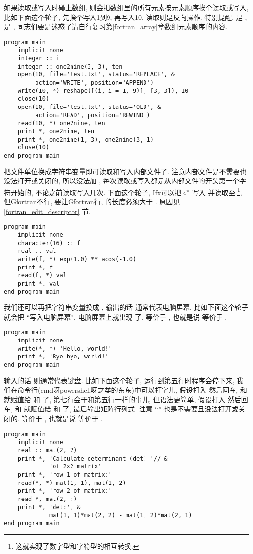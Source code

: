 如果读取或写入时碰上数组, 则会把数组里的所有元素按元素顺序挨个读取或写入, 比如下面这个轮子, 先挨个写入1到9, 再写入10, 读取则是反向操作. 特别提醒,  是 ,  是 , 同志们要是迷惑了请自行复习第\ref{fortran_array}章数组元素顺序的内容. 
\begin{lstlisting}
program main
    implicit none
    integer :: i
    integer :: one2nine(3, 3), ten
    open(10, file='test.txt', status='REPLACE', &
         action='WRITE', position='APPEND')
    write(10, *) reshape([(i, i = 1, 9)], [3, 3]), 10
    close(10)
    open(10, file='test.txt', status='OLD', &
         action='READ', position='REWIND')
    read(10, *) one2nine, ten
    print *, one2nine, ten
    print *, one2nine(1, 3), one2nine(3, 1)
    close(10)
end program main
\end{lstlisting}

把文件单位换成字符串变量即可读取和写入内部文件了. 注意内部文件是不需要也没法打开或关闭的, 所以没法加 , 每次读取或写入都是从内部文件的开头第一个字符开始的, 不论之前读取写入几次. 下面这个轮子, Ifx可以把 $ e^\pi $ 写入  并读取至 \footnote{这就实现了数字型和字符型的相互转换.}, 但Gfortran不行, 要让Gfortran行,  的长度必须大于 . 原因见 \ref{fortran_edit_descriptor} 节. \label{internal_file}
\begin{lstlisting}
program main
    implicit none
    character(16) :: f
    real :: val
    write(f, *) exp(1.0) ** acos(-1.0)
    print *, f
    read(f, *) val
    print *, val
end program main
\end{lstlisting}

我们还可以再把字符串变量换成 \ttt{*}, 输出的话 \ttt{*} 通常代表电脑屏幕. 比如下面这个轮子就会把  ``写入电脑屏幕'', 电脑屏幕上就出现  了.  等价于 , 也就是说  等价于 .
\begin{lstlisting}
program main
    implicit none
    write(*, *) 'Hello, world!'
    print *, 'Bye bye, world!'
end program main
\end{lstlisting}
输入的话 \ttt{*} 则通常代表键盘. 比如下面这个轮子, 运行到第五行时程序会停下来, 我们在命令行(cmd呀powershell呀之类的东东)中可以打字儿, 假设打入  然后回车, 和  就赋值给  和  了, 第七行会干和第五行一样的事儿, 但语法更简单, 假设打入 然后回车, 和 就赋值给  和  了, 最后输出矩阵行列式. 注意 ``\ttt{*}'' 也是不需要且没法打开或关闭的.  等价于 , 也就是说  等价于 .
\begin{lstlisting}
program main
    implicit none
    real :: mat(2, 2)
    print *, 'Calculate determinant (det) '// &
             'of 2x2 matrix'
    print *, 'row 1 of matrix:'
    read(*, *) mat(1, 1), mat(1, 2)
    print *, 'row 2 of matrix:'
    read *, mat(2, :)
    print *, 'det:', &
             mat(1, 1)*mat(2, 2) - mat(1, 2)*mat(2, 1)
end program main
\end{lstlisting}

